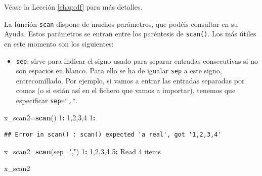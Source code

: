 \documentclass[]{book}
\newenvironment{Shaded}{\begin{snugshade}}{\end{snugshade}}
\newcommand{\DataTypeTok}[1]{\textcolor[rgb]{0.13,0.29,0.53}{#1}}
\newcommand{\DecValTok}[1]{\textcolor[rgb]{0.00,0.00,0.81}{#1}}
\newcommand{\KeywordTok}[1]{\textcolor[rgb]{0.13,0.29,0.53}{\textbf{#1}}}
\newcommand{\NormalTok}[1]{#1}
\newcommand{\OperatorTok}[1]{\textcolor[rgb]{0.81,0.36,0.00}{\textbf{#1}}}
\newcommand{\StringTok}[1]{\textcolor[rgb]{0.31,0.60,0.02}{#1}}
\providecommand{\tightlist}{%
  \setlength{\itemsep}{0pt}\setlength{\parskip}{0pt}}
\theoremstyle{definition}
\theoremstyle{definition}
\theoremstyle{definition}
\theoremstyle{remark}
\begin{document}
\begin{Shaded}
\end{Shaded}

Véase la Lección \ref{chap:df} para más detalles.

La función \texttt{scan} dispone de muchos parámetros, que podéis consultar en su Ayuda. Estos parámetros se entran entre los paréntesis de \texttt{scan()}. Los más útiles en este momento son los siguientes:

\begin{itemize}
\tightlist
\item
  \texttt{sep}: sirve para indicar el signo usado para separar entradas consecutivas si no son espacios en blanco. Para ello se ha de igualar \texttt{sep} a este signo, entrecomillado. Por ejemplo, si vamos a entrar las entradas separadas por comas (o si están así en el fichero que vamos a importar), tenemos que especificar \texttt{sep=","}.
\end{itemize}

\begin{Shaded}
\begin{Highlighting}[]
\NormalTok{x_scan2=}\KeywordTok{scan}\NormalTok{()  }
\DecValTok{1}\OperatorTok{:}\StringTok{ }\DecValTok{1}\NormalTok{,}\DecValTok{2}\NormalTok{,}\DecValTok{3}\NormalTok{,}\DecValTok{4}
\DecValTok{1}\OperatorTok{:}\StringTok{ }
\end{Highlighting}
\end{Shaded}

\begin{verbatim}
## Error in scan() : scan() expected 'a real', got '1,2,3,4'
\end{verbatim}

\begin{Shaded}
\begin{Highlighting}[]
\NormalTok{x_scan2=}\KeywordTok{scan}\NormalTok{(}\DataTypeTok{sep=}\StringTok{","}\NormalTok{)}
\DecValTok{1}\OperatorTok{:}\StringTok{ }\DecValTok{1}\NormalTok{,}\DecValTok{2}\NormalTok{,}\DecValTok{3}\NormalTok{,}\DecValTok{4}
\DecValTok{5}\OperatorTok{:}\StringTok{ }
\NormalTok{Read }\DecValTok{4}\NormalTok{ items}
\end{Highlighting}
\end{Shaded}

\begin{Shaded}
\begin{Highlighting}[]
\NormalTok{x_scan2}
\end{Highlighting}
\end{Shaded}
\end{document}
